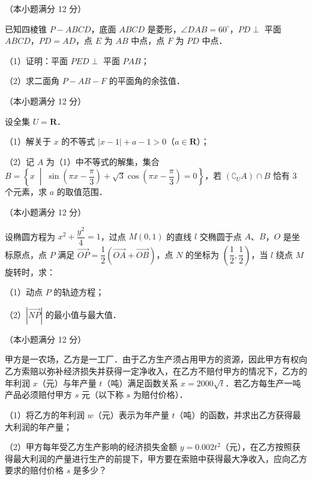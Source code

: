 \Needspace{0.4\textheight}
\begin{question}
（本小题满分 12 分）

已知四棱锥 $P - ABCD$，底面 $ABCD$ 是菱形，$\angle DAB = 60^\circ$，$PD \perp$ 平面 $ABCD$，$PD = AD$，点 $E$ 为 $AB$ 中点，点 $F$ 为 $PD$ 中点．

（1）证明：平面 $PED \perp$ 平面 $PAB$；

（2）求二面角 $P - AB - F$ 的平面角的余弦值．
\nopagebreak[4]
\begin{center}\end{center}
\nopagebreak[4]
\end{question}
\begin{question}
（本小题满分 12 分）

设全集 $U = \mathbf{R}$．

（1）解关于 $x$ 的不等式 $|x - 1| + a - 1 > 0$（$a \in \mathbf{R}$）；

（2）记 $A$ 为（1）中不等式的解集，集合 $B = \left\{x \;\middle|\; \sin\left(\pi x - \dfrac{\pi}{3}\right) + \sqrt{3}\cos\left(\pi x - \dfrac{\pi}{3}\right) = 0\right\}$，若 $(\complement_U A) \cap B$ 恰有 3 个元素，求 $a$ 的取值范围．

\end{question}
\begin{question}
（本小题满分 12 分）

设椭圆方程为 $x^2 + \dfrac{y^2}{4} = 1$，过点 $M(0, 1)$ 的直线 $l$ 交椭圆于点 $A$、$B$，$O$ 是坐标原点，点 $P$ 满足 $\vec{OP} = \dfrac{1}{2}(\vec{OA} + \vec{OB})$，点 $N$ 的坐标为 $\left(\dfrac{1}{2}, \dfrac{1}{2}\right)$，当 $l$ 绕点 $M$ 旋转时，求：

（1）动点 $P$ 的轨迹方程；

（2）$|\vec{NP}|$ 的最小值与最大值．

\end{question}
\begin{question}
（本小题满分 12 分）

甲方是一农场，乙方是一工厂．由于乙方生产须占用甲方的资源，因此甲方有权向乙方索赔以弥补经济损失并获得一定净收入，在乙方不赔付甲方的情况下，乙方的年利润 $x$（元）与年产量 $t$（吨）满足函数关系 $x = 2000\sqrt{t}$．若乙方每生产一吨产品必须赔付甲方 $s$ 元（以下称 $s$ 为赔付价格）．

（1）将乙方的年利润 $w$（元）表示为年产量 $t$（吨）的函数，并求出乙方获得最大利润的年产量；

（2）甲方每年受乙方生产影响的经济损失金额 $y = 0.002t^2$（元），在乙方按照获得最大利润的产量进行生产的前提下，甲方要在索赔中获得最大净收入，应向乙方要求的赔付价格 $s$ 是多少？

\end{question}
